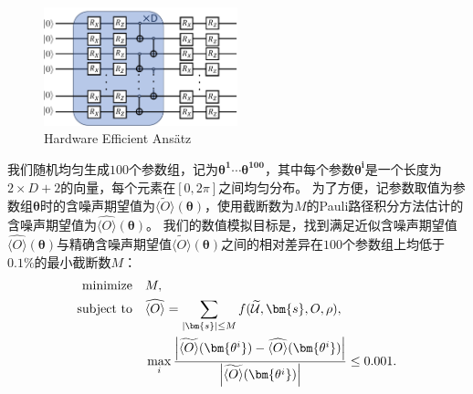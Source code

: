 \begin{figure}[htbp]
    \centering
    \includegraphics[width=0.5\textwidth]{figures/complexity2/HEA.pdf}
    \caption{Hardware Efficient Ans\"atz}\label{fig:HEA_Ansatz}
\end{figure}

我们随机均匀生成$100$个参数组，记为$\bm{\theta^1}\cdots \bm{\theta^{100}}$，其中每个参数$\bm{\theta^i}$是一个长度为$2\times D+2$的向量，每个元素在$[0,2\pi]$之间均匀分布。
为了方便，记参数取值为参数组$\bm{\theta}$时的含噪声期望值为$\widetilde{\langle O \rangle}(\bm{\theta})$，使用截断数为$M$的Pauli路径积分方法估计的含噪声期望值为$\widehat{\langle O \rangle}(\bm{\theta})$。
我们的数值模拟目标是，找到满足近似含噪声期望值$\widehat{\langle O \rangle}(\bm{\theta})$与精确含噪声期望值$\widetilde{\langle O \rangle}(\bm{\theta})$之间的相对差异在$100$个参数组上均低于$0.1\%$的最小截断数$M$：
\begin{equation}
    \begin{aligned}
        \text{minimize} \quad & M,\\
        \text{subject to} \quad & \widehat{\langle O \rangle}=\sum_{\abs{\bm{s}}\leq M}f(\widetilde{\mathcal{U}},\bm{s},O,\rho),\\
        &\max_{i}\frac{\abs{\widetilde{\langle O \rangle}(\bm{\theta^i})-\widehat{\langle O \rangle}(\bm{\theta^i})}}{\abs{\widetilde{\langle O \rangle}(\bm{\theta^i})}}\leq 0.001.
    \end{aligned}
\end{equation}

